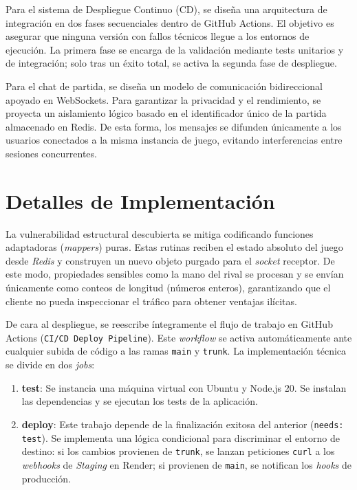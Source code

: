 Para el sistema de Despliegue Continuo (CD), se diseña una arquitectura de integración en dos fases secuenciales dentro de GitHub Actions. El objetivo es asegurar que ninguna versión con fallos técnicos llegue a los entornos de ejecución. La primera fase se encarga de la validación mediante tests unitarios y de integración; solo tras un éxito total, se activa la segunda fase de despliegue.

Para el chat de partida, se diseña un modelo de comunicación bidireccional apoyado en WebSockets. Para garantizar la privacidad y el rendimiento, se proyecta un aislamiento lógico basado en el identificador único de la partida almacenado en Redis. De esta forma, los mensajes se difunden únicamente a los usuarios conectados a la misma instancia de juego, evitando interferencias entre sesiones concurrentes.

\section{Detalles de Implementación}
La vulnerabilidad estructural descubierta se mitiga codificando funciones adaptadoras (\textit{mappers}) puras. Estas rutinas reciben el estado absoluto del juego desde \textit{Redis} y construyen un nuevo objeto purgado para el \textit{socket} receptor. De este modo, propiedades sensibles como la mano del rival se procesan y se envían únicamente como conteos de longitud (números enteros), garantizando que el cliente no pueda inspeccionar el tráfico para obtener ventajas ilícitas.

De cara al despliegue, se reescribe íntegramente el flujo de trabajo en GitHub Actions (\texttt{CI/CD Deploy Pipeline}). Este \textit{workflow} se activa automáticamente ante cualquier subida de código a las ramas \texttt{main} y \texttt{trunk}. La implementación técnica se divide en dos \textit{jobs}:
\begin{enumerate}
    \item \textbf{test}: Se instancia una máquina virtual con Ubuntu y Node.js 20. Se instalan las dependencias y se ejecutan los tests de la aplicación.
    \item \textbf{deploy}: Este trabajo depende de la finalización exitosa del anterior (\texttt{needs: test}). Se implementa una lógica condicional para discriminar el entorno de destino: si los cambios provienen de \texttt{trunk}, se lanzan peticiones \texttt{curl} a los \textit{webhooks} de \textit{Staging} en Render; si provienen de \texttt{main}, se notifican los \textit{hooks} de producción.
\end{enumerate}

